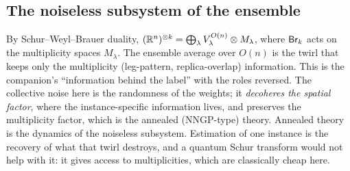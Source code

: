 \subsection{The noiseless subsystem of the ensemble}
By Schur--Weyl--Brauer duality, $(\mathbb R^n)^{\otimes k}=\bigoplus_\lambda V^{O(n)}_\lambda\otimes M_\lambda$, where $\mathsf{Br}_k$ acts on the multiplicity spaces $M_\lambda$. The
ensemble average over $O(n)$ is the twirl that keeps only the multiplicity (leg-pattern, replica-overlap) information. This is the
companion's ``information behind the label'' with the roles reversed. The collective noise here is the randomness of the weights; it
\emph{decoheres the spatial factor}, where the instance-specific information lives, and preserves the multiplicity factor, which is the
annealed (NNGP-type) theory. Annealed theory is the dynamics of the noiseless subsystem. Estimation of one instance is the recovery of
what that twirl destroys, and a quantum Schur transform would not help with it: it gives access to multiplicities, which are classically
cheap here.
